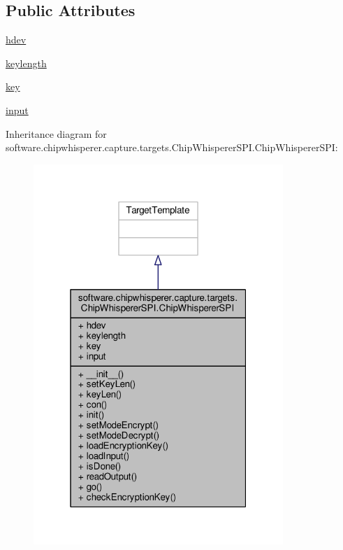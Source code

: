 \subsection*{Public Attributes}
\begin{DoxyCompactItemize}
\item 
\hyperlink{classsoftware_1_1chipwhisperer_1_1capture_1_1targets_1_1ChipWhispererSPI_1_1ChipWhispererSPI_adb4a6fdec9b4db53bafce754142ea6bd}{hdev}
\item 
\hyperlink{classsoftware_1_1chipwhisperer_1_1capture_1_1targets_1_1ChipWhispererSPI_1_1ChipWhispererSPI_a1c76a1307e486eb4dbe07a4b4d293410}{keylength}
\item 
\hyperlink{classsoftware_1_1chipwhisperer_1_1capture_1_1targets_1_1ChipWhispererSPI_1_1ChipWhispererSPI_a61940f5cc3ccf0efa45d7ce0c3622433}{key}
\item 
\hyperlink{classsoftware_1_1chipwhisperer_1_1capture_1_1targets_1_1ChipWhispererSPI_1_1ChipWhispererSPI_a2e87e31439adf64e099abfddf7081c87}{input}
\end{DoxyCompactItemize}


Inheritance diagram for software.\+chipwhisperer.\+capture.\+targets.\+Chip\+Whisperer\+S\+P\+I.\+Chip\+Whisperer\+S\+P\+I\+:\nopagebreak
\begin{figure}[H]
\begin{center}
\leavevmode
\includegraphics[width=268pt]{d1/d8a/classsoftware_1_1chipwhisperer_1_1capture_1_1targets_1_1ChipWhispererSPI_1_1ChipWhispererSPI__inherit__graph}
\end{center}
\end{figure}


